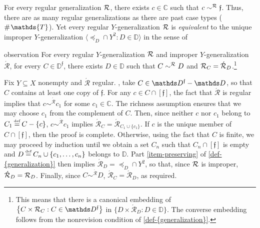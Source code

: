 \documentclass[12pt,a4paper,twoside]{article}
\newcommand{\novel}{\mathfrak f}
\newcommand{\preceqb}{\mathbin{\preceq}}
\newcommand{\countof}{\mathbin{\#}\hskip1pt}
\newcommand{\ext}{\mathrel{\mc R}}
\newcommand{\extb}{\mathbin{\mc R}}
\newcommand{\aext}{\mathrel{\acute{\mathrel{\mathcal R}}}}
\newcommand{\aextb}{\mathbin{\acute{\mathbin{\mathcal R}}}}
\newcommand{\mbbd}{{\mathds D}}
\newcommand{\mbbdp}{{\mathds D^{\novel}}}
\newcommand{\mbbc}{{\mathds C}}
\newcommand{\mbbt}{{\mathds {T}}}
\begin{document}

For every regular {generalization} $\ext$, there exists $c \in \mbbc$ such that
$c \sim^{\extb} \novel$. Thus, there are as many regular {generalization}s as there are
past case types (\ie\ $\countof \mbbt$).  Yet every regular $Y$-{generalization} $\ext$
is \emph{equivalent} to the unique improper $Y$-{generalization}
$\langle \preceqb_{D} \cap Y^{2}: D \in \mbbd\rangle$ in the sense of 
\begin{theoremEnd}{observation}\label{obs-reg-eq}%
  For every regular $Y$-{generalization} $\ext$ and improper $Y$-{generalization} $\aext$, for
  every $C \in \mbbdp$, there exists $D \in \mbbd$ such that
  $C \sim^{\extb} D$ and $\extb_{C} = \aextb_{D}$.\footnote{This means that
    there is a canonical embedding of
    $\left\{C \times \extb_{C}: C \in \mbbdp\right\}$ in
    $\{D \times \aextb_{D}: D \in \mbbd\}$. The converse embedding follows from
    the nonrevision condition of \cref{def-{generalization}}.} %
\end{theoremEnd}

\begin{proofEnd}\label{proof-reg-eq} Fix $Y\subseteq
  X$ nonempty and $\aext$ regular.  \Wlog, take $C \in \mbbdp \bs \mbbd$, so
  that $C$ contains at least one copy of $\novel$.  For any $c \in C \cap [
    \novel ]$, the fact that $\aext$ is regular implies that $c \sim^{\aextb} c
  _ 1$ for some $c _ 1 \in \mbbc$.  The richness assumption ensures that we may
  choose $c _ 1$ from the complement of $C$.  Then, since neither $c$ nor
  $c_{1}$ belong to $C _ 1 \defeq C \bs \{c\}$, $c \sim^{\aextb} c_{1}$ implies
  $\aextb_{C} = \aextb _ { C _ 1 \cup \{c_{1}\} }$.  If $c$ is the unique
  member of $C \cap [ \novel ]$, then the proof is complete.  Otherwise, using
  the fact that $C$ is finite, we may proceed by induction until we obtain a
  set $C _ n$ such that $C _ n \cap [\novel ]$ is empty and $D \defeq C _ n
  \cup \{ c _ 1 , \dots , c _ n \}$ belongs to $\mbbd$.  Part
  \ref{item-preserving} of \cref{def-{generalization}} then implies $\aextb _ {
    D } = \preceqb _ { D } \cap Y^{2}$, so that, since $\ext$ is
  improper, $\aextb_{D}=\extb_{D}$.  Finally, since $C \sim ^{\aextb} D$,
$\aextb _ { C } = \aextb_{D}$, as required.
\end{proofEnd}
\end{document}
